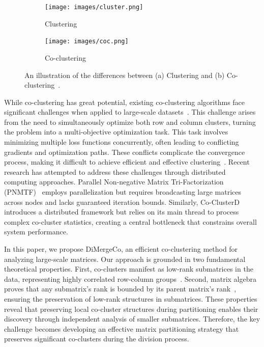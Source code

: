 \documentclass[journal]{IEEEtran}
\theoremstyle{definition}
\theoremstyle{remark} %
\renewcommand{\cite}[1]{~\autocite{#1}}
\begin{document}
\begin{figure}[!t]
    \centering
    \begin{subfigure}[b]{0.22\textwidth}
        \centering
        \texttt{[image: images/cluster.png]}
        \caption{Clustering}
        \label{fig:cluster}
    \end{subfigure}%
    \hfill
    \begin{subfigure}[b]{0.22\textwidth}
        \centering
        \texttt{[image: images/coc.png]}
        \caption{Co-clustering}
        \label{fig:cocluster}
    \end{subfigure}%
    \caption{An illustration of the differences between (a) Clustering and (b) Co-clustering\cite{yan2017CoclusteringMultidimensionalBig}.}
    \label{fig:cocomparison}
\end{figure}


While co-clustering has great potential, existing co-clustering algorithms face significant challenges when applied to large-scale datasets\cite{cheng2015CoClusterDDistributedFramework}. This challenge arises from the need to simultaneously optimize both row and column clusters, turning the problem into a multi-objective optimization task. This task involves minimizing multiple loss functions concurrently, often leading to conflicting gradients and optimization paths. These conflicts complicate the convergence process, making it difficult to achieve efficient and effective clustering\cite{coello2007EvolutionaryAlgorithmsSolving}. Recent research has attempted to address these challenges through distributed computing approaches. Parallel Non-negative Matrix Tri-Factorization (PNMTF)\cite{chen2023ParallelNonNegativeMatrix} employs parallelization but requires broadcasting large matrices across nodes and lacks guaranteed iteration bounds. Similarly, Co-ClusterD\cite{cheng2015CoClusterDDistributedFramework} introduces a distributed framework but relies on its main thread to process complex co-cluster statistics, creating a central bottleneck that constrains overall system performance.

In this paper, we propose DiMergeCo, an efficient co-clustering method for analyzing large-scale matrices. Our approach is grounded in two fundamental theoretical properties. First, co-clusters manifest as low-rank submatrices in the data, representing highly correlated row-column groups\cite{zhao2016IdentifyingMultidimensionalCoclusters,wu2024ScalableCoClusteringLargeScale}. Second, matrix algebra proves that any submatrix's rank is bounded by its parent matrix's rank\cite{horn1985MatrixAnalysis}, ensuring the preservation of low-rank structures in submatrices. These properties reveal that preserving local co-cluster structures during partitioning enables their discovery through independent analysis of smaller submatrices. Therefore, the key challenge becomes developing an effective matrix partitioning strategy that preserves significant co-clusters during the division process.
\end{document}
